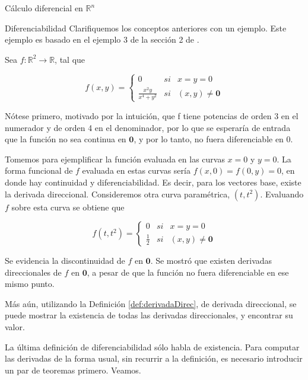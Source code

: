 \begin{chapter}{Cálculo diferencial en $\mathbb{R}^n$}
\begin{section}{Diferenciabilidad}
Clarifiquemos los conceptos anteriores con un ejemplo. Este ejemplo es basado en el ejemplo 3 de la sección 2 de \cite{munkres1991analysis}.

\begin{exmp}
\label{exmp:diferencDerDir}
Sea $f: \mathbb{R}^2 \longrightarrow \mathbb{R}$, tal que

\begin{equation*}
    f(x,y) = \left\{\begin{array}{lcc}
        0 & si & x=y=0  \\
        \frac{x^2y}{x^4+y^2} & si & (x,y) \neq \textbf{0} 
    \end{array}\right.
\end{equation*}

Nótese primero, motivado por la intuición, que f tiene potencias de orden 3 en el numerador y de orden 4 en el denominador, por lo que se esperaría de entrada que la función no sea continua en $\textbf{0}$, y por lo tanto, no fuera diferenciable en 0.

Tomemos para ejemplificar la función evaluada en las curvas $x=0$ y $y=0$. La forma funcional de $f$ evaluada en estas curvas sería $f(x,0) = f(0,y) = 0$, en donde hay continuidad y diferenciabilidad. Es decir, para los vectores base, existe la derivada direccional. Consideremos otra curva paramétrica, $(t,t^2)$. Evaluando $f$ sobre esta curva se obtiene que

\begin{equation*}
    f(t,t^2) = \left\{\begin{array}{lcc}
        0 & si & x=y=0  \\
        \frac{1}{2} & si & (x,y) \neq \textbf{0} 
    \end{array}\right.
\end{equation*}

Se evidencia la discontinuidad de $f$ en $\textbf{0}$. Se mostró que existen derivadas direccionales de $f$ en $\textbf{0}$, a pesar de que la función no fuera diferenciable en ese mismo punto.

Más aún, utilizando la Definición \ref{def:derivadaDirec}, de derivada direccional, se puede mostrar la existencia de todas las derivadas direccionales, y encontrar su valor.

\end{exmp}

La última definición de diferenciabilidad sólo habla de existencia. Para computar las derivadas de la forma usual, sin recurrir a la definición, es necesario introducir un par de teoremas primero. Veamos.


\end{section}
\end{chapter}
